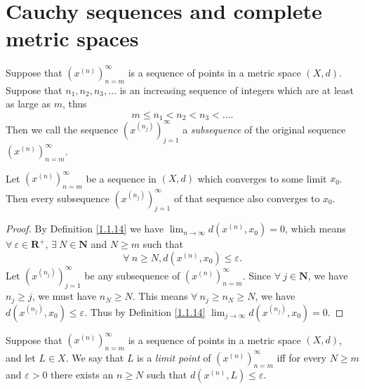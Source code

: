 \section{Cauchy sequences and complete metric spaces}\label{sec 1.4}

\begin{definition}[Subsequences]\label{1.4.1}
    Suppose that \((x^{(n)})_{n = m}^\infty\) is a sequence of points in a metric space \((X, d)\).
    Suppose that \(n_1, n_2, n_3, \dots\) is an increasing sequence of integers which are at least as large as \(m\), thus
    \[
        m \leq n_1 < n_2 < n_3 < \dots.
    \]
    Then we call the sequence \((x^{(n_j)})_{j = 1}^\infty\) a \emph{subsequence} of the original sequence \((x^{(n)})_{n = m}^\infty\).
\end{definition}

\setcounter{theorem}{2}
\begin{lemma}\label{1.4.3}
    Let \((x^{(n)})_{n = m}^\infty\) be a sequence in \((X, d)\) which converges to some limit \(x_0\).
    Then every subsequence \((x^{(n_j)})_{j = 1}^\infty\) of that sequence also converges to \(x_0\).
\end{lemma}

\begin{proof}
    By Definition \ref{1.1.14} we have \(\lim_{n \to \infty} d(x^{(n)}, x_0) = 0\), which means \(\forall\ \varepsilon \in \mathbf{R}^+\), \(\exists\ N \in \mathbf{N}\) and \(N \geq m\) such that
    \[
        \forall\ n \geq N, d(x^{(n)}, x_0) \leq \varepsilon.
    \]
    Let \((x^{(n_j)})_{j = 1}^\infty\) be any subsequence of \((x^{(n)})_{n = m}^\infty\).
    Since \(\forall\ j \in \mathbf{N}\), we have \(n_j \geq j\), we must have \(n_N \geq N\).
    This means \(\forall\ n_j \geq n_N \geq N\), we have \(d(x^{(n_j)}, x_0) \leq \varepsilon\).
    Thus by Definition \ref{1.1.14} \(\lim_{j \to \infty} d(x^{(n_j)}, x_0) = 0\).
\end{proof}

\begin{definition}\label{1.4.4}
    Suppose that \((x^{(n)})_{n = m}^\infty\) is a sequence of points in a metric space \((X, d)\), and let \(L \in X\).
    We say that \(L\) is a \emph{limit point} of \((x^{(n)})_{n = m}^\infty\) iff for every \(N \geq m\) and \(\varepsilon > 0\) there exists an \(n \geq N\) such that \(d(x^{(n)}, L) \leq \varepsilon\).
\end{definition}